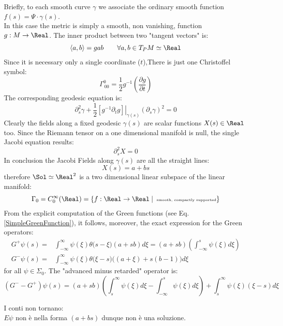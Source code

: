 \documentclass[Main]{subfiles}
\begin{document}
		Briefly, to each smooth curve $\gamma$ we associate the ordinary smooth function $f(s) = \Psi \cdot \gamma (s)$.\\
		In this case the metric is simply a smooth, non vanishing, function $g: M \rightarrow \Real$. The inner product between two "tangent vectors" is:
		\begin{displaymath}
			\left< a , b \right> = g a b \qquad \forall a,b \in T_P M \simeq \Real
		\end{displaymath}
		\ifToninus Since it is necessary only a single coordinate ($t$),\fi There is just one Christoffel symbol:
		\begin{displaymath}
			\Gamma^0_{\, 0 0} = \frac{1}{2} g^{-1} \left( \frac{\partial g}{\partial t} \right)
		\end{displaymath}
		The corresponding geodesic equation is:
		\begin{displaymath}
			\partial^2_s \gamma + \frac{1}{2}\left.\left[ g^{-1}  \partial_t g \right] \right\vert_{\gamma(s)}  \left(\partial_s\gamma\right) ^2 = 0
		\end{displaymath}
		Clearly the fields along a fixed geodesic $\gamma(s)$ are scalar functions $X(s) \in \Real$ too.
		Since the Riemann tensor on a one dimensional manifold is null, the single Jacobi equation results:
		\begin{displaymath}
			\partial_s^2 X = 0
		\end{displaymath}
		In conclusion the Jacobi Fields along $\gamma(s)$ are all the straight lines:
		\begin{displaymath}
			X(s) = a + b s
		\end{displaymath}
		therefore $\Sol \simeq \Real^2$ is a two dimensional linear subspace of the linear manifold:
		\begin{displaymath}
			\Gamma_0 = C_0^\infty (\Real) = \{ f: \Real \rightarrow \Real \; \vert \, \textrm{ \tiny smooth, compactly supported}\}
		\end{displaymath}
		From the explicit computation of the Green functions (see Eq. \ref{SimpleGreenFunction}), it follows, moreover, the exact expression for the Green operators:
		\begin{align*}
			G^+ \psi (s) =& \int_{-\infty}^\infty \psi(\xi) \theta\big( s-\xi \big) \left( a + s b \right) d\xi 
			=  \left( a + s b \right) \left(\int_{-\infty}^{s}  \psi(\xi) d\xi\right)	\\
			G^- \psi (s)=& \int_{-\infty}^\infty \psi(\xi) \theta\big( \xi -s \big) \big( (a + \xi)  + s ( b  - 1) \big) d\xi 
		\end{align*}
		for all  $\psi \in \Sigma_0$.
		The "advanced minus retarded" operator is:
		\begin{displaymath}
			( G^- -  G^+ ) \psi(s) =  \left( a + s b \right) \left(\int_{s}^{\infty} \psi(\xi) d\xi - \int_{-\infty}^{s} \psi(\xi) d\xi \right) + \int_{s}^{\infty} \psi(\xi) ( \xi -s) d\xi
		\end{displaymath}
		\begin{Warning}
			I conti non tornano:\\  $E \psi$ non è nella forma $(a +b s)$ dunque non è una soluzione.
		\end{Warning}
\end{document}
